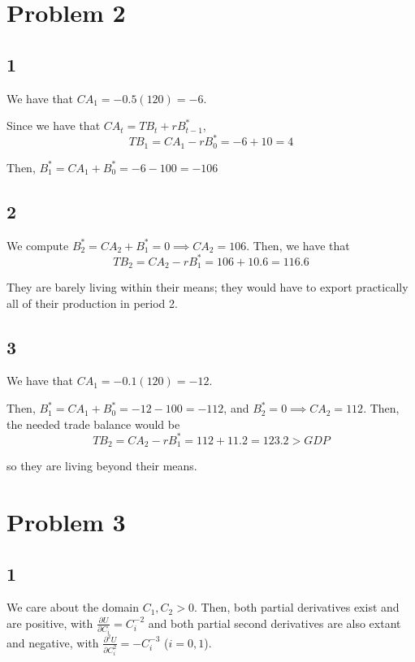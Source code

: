 \documentclass[12pt,letterpaper]{article}
\theoremstyle{definition}
\begin{document}
\section*{Problem 2}

\subsection*{1}

We have that $CA_1 = -0.5(120) = -6$.

Since we have that $CA_t = TB_t + rB_{t-1}^*$,
\[
  TB_1 = CA_1 - rB_{0}^* = -6 + 10 = 4
\]

Then, $B_1^* = CA_1 + B_0^* = -6 - 100 = -106$

\subsection*{2}

We compute $B_2^* = CA_2 + B_1^* = 0 \implies CA_2 = 106$. Then, we have that
\[
  TB_2 = CA_2 - rB_1^* = 106 + 10.6 = 116.6
\]

They are barely living within their means; they would have to export practically
all of their production in period 2.

\subsection*{3}

We have that $CA_1 = -0.1(120) = -12$.

Then, $B_1^* = CA_1 + B_0^* = -12  - 100= -112$, and $B_2^* = 0\implies CA_2 =
112$. Then, the needed trade balance would be
\[
  TB_2 = CA_2 - rB_1^* = 112 + 11.2 = 123.2 > GDP
\]

so they are living beyond their means.

\section*{Problem 3}

\subsection*{1}

We care about the domain $C_1, C_2 > 0$. Then, both partial derivatives exist
and are positive, with $\frac{\partial U}{\partial C_i} = C_i^{-2}$ and
both partial second derivatives are also extant and negative, with
$\frac{\partial^2 U}{\partial C_i^2} = -C_i^{-3}$ ($i = 0,1$).
\end{document}
